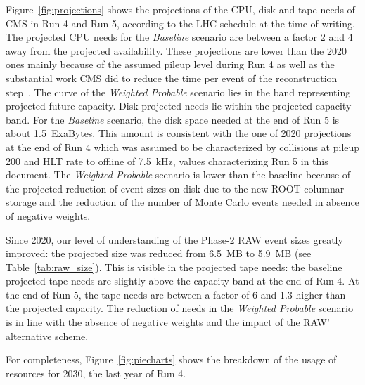 \documentclass{cmspaper}
\begin{document}
Figure~\ref{fig:projections} shows the projections of the CPU, disk and tape needs of CMS in Run 4 and Run 5, according to the LHC schedule at the time of writing.
The projected CPU needs for the \textit{Baseline} scenario are between a factor 2 and 4 away from the projected availability. These projections are lower than the 2020 ones mainly because of the assumed pileup level during Run 4 as well as the substantial work CMS did to reduce the time per event of the reconstruction step~\cite{lhcc_open_session_november_2020}.
The curve of the \textit{Weighted Probable} scenario lies in the band representing projected future capacity. 
Disk projected needs lie within the projected capacity band. For the \textit{Baseline} scenario, the disk space needed at the end of Run 5 is about 1.5~ExaBytes. This amount is consistent with the one of 2020 projections at the end of Run 4 which was assumed to be characterized by collisions at pileup 200 and HLT rate to offline of 7.5~kHz, values characterizing Run 5 in this document. The \textit{Weighted Probable} scenario is lower than the baseline because of the projected reduction of event sizes on disk due to the new ROOT columnar storage and the reduction of the number of Monte Carlo events needed in absence of negative weights.

Since 2020, our level of understanding of the Phase-2 RAW event sizes greatly improved: the projected size was reduced from 6.5~MB to 5.9~MB (see Table~\ref{tab:raw_size}). This is visible in the projected tape needs: the baseline projected tape needs are slightly above the capacity band at the end of Run 4. At the end of Run 5, the tape needs are between a factor of 6 and 1.3 higher than the projected capacity. The reduction of needs in the \textit{Weighted Probable} scenario is in line with the absence of negative weights and the impact of the RAW' alternative scheme.

For completeness, Figure~\ref{fig:piecharts} shows the breakdown of the usage of resources for 2030, the last year of Run 4. 

\newpage
\end{document}
